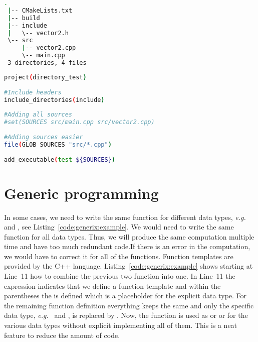 \begin{minipage}{\linewidth}
\begin{minipage}{0.45\linewidth}
\begin{lstlisting}[language=bash,caption={Structure of a CMake project.\label{code:cmake:folder}},emph={project, add_executable,cmake_minimum_required},emphstyle={\color{azure}\bfseries\underbar}]
 .
 |-- CMakeLists.txt
 |-- build
 |-- include
 |   \-- vector2.h
 \-- src
     |-- vector2.cpp
     \-- main.cpp
 3 directories, 4 files
\end{lstlisting}
\end{minipage}
\hfill
\begin{minipage}{0.45\linewidth}
\begin{lstlisting}[language=bash,caption={Build instructions for CMake.\label{code:cmake:complex}},emph={project, add_executable,cmake_minimum_required,include_directories,file},emphstyle={\color{azure}\bfseries\underbar}]
project(directory_test)
 
#Include headers
include_directories(include)
 
#Adding all sources 
#set(SOURCES src/main.cpp src/vector2.cpp)
 
#Adding sources easier
file(GLOB SOURCES "src/*.cpp")
 
add_executable(test ${SOURCES})
\end{lstlisting}
\end{minipage}
\end{minipage}


\section{Generic programming}
\label{sec:generic:programming}
In some cases, we need to write the same function for different data types, \emph{e.g.}\  and , see Listing~\ref{code:generix:example}. We would need to write the same function for all data types. Thus, we will produce the same computation multiple time and have too much redundant code.If there is an error in the computation, we would have to correct it for all of the functions. Function templates are provided by the C++ language. Listing~\ref{code:generix:example} shows starting at Line~11 how to combine the previous two function into one. In Line~11 the expression  indicates that we define a function template and within the parentheses the  is defined which is a placeholder for the explicit data type. For the remaining function definition everything keeps the same and only the specific data type, \emph{e.g.}\  and , is replaced by . Now, the function is used as  or  or  for the various data types without explicit implementing all of them. This is a neat feature to reduce the amount of code.\\

